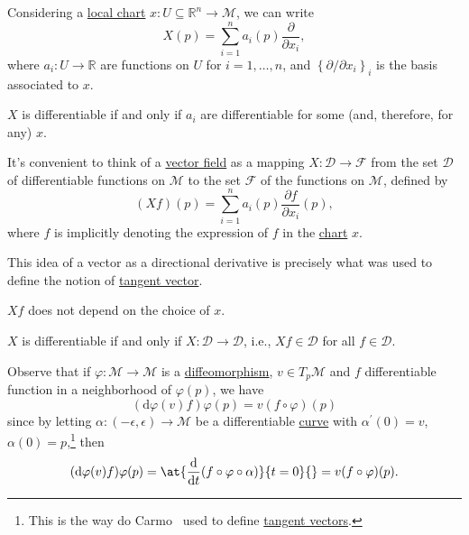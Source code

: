 Considering a \hyperref[def:coordinate-chart]{local chart} \(x\colon U \subseteq \mathbb{R} ^n \to \mathcal{M} \), we can write
\[
	X(p) = \sum_{i=1}^{n} a_i(p) \frac{\partial }{\partial x_i},
\]
where \(a_i\colon U \to \mathbb{R} \) are functions on \(U\) for \(i = 1, \ldots , n\), and \(\left\{ \partial / \partial x_i \right\}_{i} \) is the basis associated to \(x\).

\begin{remark}
	\(X\) is differentiable if and only if \(a_i\) are differentiable for some (and, therefore, for any) \(x\).
\end{remark}

It's convenient to think of a \hyperref[def:vector-field]{vector field} as a mapping \(X\colon \mathcal{D} \to \mathcal{F} \) from the set \(\mathcal{D} \) of differentiable functions on \(\mathcal{M} \) to the set \(\mathcal{F} \) of the functions on \(\mathcal{M} \), defined by
\[
	(Xf)(p) = \sum_{i=1}^{n} a_i(p)\frac{\partial f}{\partial x_i} (p),
\]
where \(f\) is implicitly denoting the expression of \(f\) in the \hyperref[def:coordinate-chart]{chart} \(x\).

\begin{intuition}
	This idea of a vector as a directional derivative is precisely what was used to define the notion of \hyperref[def:tangent-vector]{tangent vector}.
\end{intuition}

\begin{remark}
	\(Xf\) does not depend on the choice of \(x\).
\end{remark}

\begin{remark}
	\(X\) is differentiable if and only if \(X\colon \mathcal{D} \to \mathcal{D} \), i.e., \(Xf\in \mathcal{D} \) for all \(f\in \mathcal{D} \).
\end{remark}

Observe that if \(\varphi \colon \mathcal{M} \to \mathcal{M} \) is a \hyperref[def:diffeomorphism]{diffeomorphism}, \(v\in T_p \mathcal{M} \) and \(f\) differentiable function in a neighborhood of \(\varphi (p)\), we have
\[
	(\mathrm{d} \varphi (v)f)\varphi (p) = v(f\circ \varphi )(p)
\]
since by letting \(\alpha \colon (-\epsilon , \epsilon ) \to \mathcal{M} \) be a differentiable \hyperref[def:curve]{curve} with \(\alpha ^\prime (0) = v\), \(\alpha (0)= p\),\footnote{This is the way do Carmo~\cite{flaherty2013riemannian} used to define \hyperref[def:tangent-vector]{tangent vectors}.} then
\[
	(\mathrm{d} \varphi (v) f) \varphi (p) = \at{\frac{\mathrm{d}}{\mathrm{d}t} (f \circ \varphi \circ \alpha )}{t=0}{} = v(f \circ \varphi )(p).
\]

